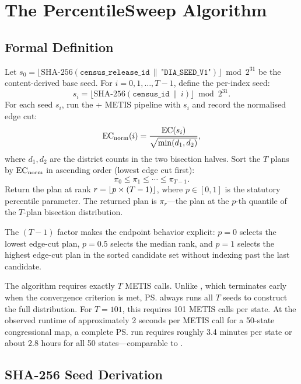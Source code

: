 \section{The PercentileSweep Algorithm}
\label{sec:algorithm}

\subsection{Formal Definition}

\begin{definition}[\ps{}$(p, T)$]
\label{def:percentile-sweep}
Let $s_0 = \lfloor \text{SHA-256}(\texttt{census\_release\_id} \,\|\,
\texttt{"DIA\_SEED\_V1"}) \rfloor \bmod 2^{31}$ be the content-derived base seed.
For $i = 0, 1, \ldots, T-1$, define the per-index seed:
\[
  s_i = \lfloor \text{SHA-256}(\texttt{census\_id} \,\|\, i) \rfloor \bmod 2^{31}.
\]
For each seed $s_i$, run the \ar{} + METIS pipeline with $s_i$ and record
the normalised edge cut:
\[
  \mathrm{EC}_{\mathrm{norm}}(i) = \frac{\mathrm{EC}(s_i)}{\sqrt{\min(d_1, d_2)}},
\]
where $d_1, d_2$ are the district counts in the two bisection halves.
Sort the $T$ plans by $\mathrm{EC}_{\mathrm{norm}}$ in ascending order (lowest edge cut first):
\[
  \pi_0 \leq \pi_1 \leq \cdots \leq \pi_{T-1}.
\]
Return the plan at rank $r = \lfloor p \times (T-1) \rfloor$, where $p \in [0, 1]$
is the statutory percentile parameter.
The returned plan is $\pi_r$---the plan at the $p$-th quantile of the
$T$-plan bisection distribution.
\end{definition}

The $(T-1)$ factor makes the endpoint behavior explicit: $p=0$ selects the
lowest edge-cut plan, $p=0.5$ selects the median rank, and $p=1$ selects the
highest edge-cut plan in the sorted candidate set without indexing past the
last candidate.

The algorithm requires exactly $T$ METIS calls.
Unlike \cs{}, which terminates early when the convergence criterion is
met, \ps{} always runs all $T$ seeds to construct the full distribution.
For $T = 101$, this requires 101 METIS calls per state.
At the observed runtime of approximately 2 seconds per METIS call for
a 50-state congressional map, a complete \ps{} run requires roughly 3.4
minutes per state or about 2.8 hours for all 50 states---comparable to
\cs{}.

\subsection{SHA-256 Seed Derivation}


